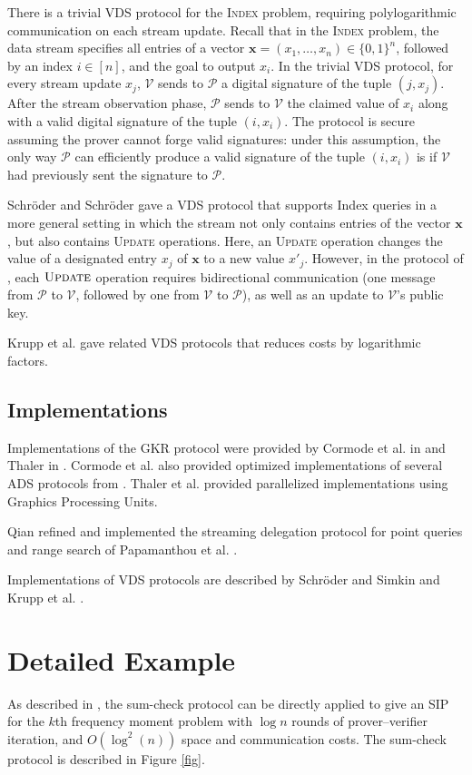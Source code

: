 \documentclass[11pt, letterpaper]{article}
\newcommand{\cV}{\mathcal{V}}
\newcommand{\cP}{\mathcal{P}}
\begin{document}
There is a trivial VDS protocol for the \textsc{Index} problem, requiring polylogarithmic communication on each stream update. Recall that in the \textsc{Index} problem, the data stream specifies all entries of a vector $\mathbf{x} = (x_1, \dots, x_n) \in \{0, 1\}^n$, followed by an index $i \in [n]$, and the goal to output $x_i$. In the trivial VDS protocol, for every stream update $x_j$, $\cV$ sends to $\cP$ a digital signature of the tuple $(j, x_j)$. After the stream observation phase, $\cP$ sends to $\cV$ the claimed value of $x_i$ along with a valid digital signature of the tuple $(i, x_i)$. The protocol is secure assuming the prover cannot forge valid signatures: under this assumption, the only way $\cP$ can efficiently produce a valid signature of the tuple $(i, x_i)$ is if $\cV$ had previously sent the signature to $\cP$.

Schr{\"o}der and Schr{\"o}der \cite{ccs} gave a VDS protocol that supports {\sc Index} queries in a more general setting in which the stream not only contains entries of the vector $\mathbf{x}$, but also contains \textsc{Update} operations. Here, an \textsc{Update} operation changes the value of a designated entry $x_j$ of $\mathbf{x}$ to a new value $x'_j$. However, in the protocol of \cite{ccs}, each $\textsc{Update}$ operation requires bidirectional communication (one message from $\cP$ to $\cV$, followed by one from $\cV$ to $\cP$), as well as an update to $\cV$'s public key. 

Krupp et al. \cite{krupp} gave related VDS protocols that reduces costs by logarithmic factors.


\subsection{Implementations}
Implementations of the GKR protocol were provided by Cormode et al. in \cite{itcs} and Thaler in \cite{crypto}. Cormode et al. \cite{itcs} also provided 
optimized implementations of several ADS protocols from \cite{icalp, esa}. Thaler et al. \cite{hotcloud} provided parallelized implementations using Graphics Processing Units. 

Qian \cite{sadimp} refined and implemented the streaming delegation protocol for point queries and range search of Papamanthou et al. \cite{eurocryptpaper}.

Implementations of VDS protocols are described by Schr{\"o}der and Simkin \cite{fc} and Krupp et al.  \cite{krupp}.


\section{Detailed Example}
As described in \cite{vldb}, the sum-check protocol can be directly applied to give an SIP for the $k$th frequency moment problem with $\log n$ rounds of prover--verifier iteration,
and $O(\log^2(n))$ space and communication costs.
The sum-check protocol is described in Figure \ref{fig}.
\end{document}
